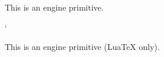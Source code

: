 \begin{function}[]
  {
    \lower
  }
  \begin{syntax}
  \end{syntax}
  This is an engine primitive.
\end{function}






\begin{function}[]
  {
    \lq
  }
  \begin{syntax}
  \end{syntax}

\end{function}



\begin{function}[]
  {
    \lrbox
  }
  \begin{syntax}
  \end{syntax}

\end{function}



\begin{function}[int]
  {
    \ltx@sh@ft
  }
  \begin{syntax}
  \end{syntax}

\end{function}



\begin{function}[]
  {
    \luabytecode
  }
  \begin{syntax}
  \end{syntax}
  This is an engine primitive (Lua\TeX{} only).
\end{function}



\begin{function}[]
  {
    \luachunk
  }
  \begin{syntax}
  \end{syntax}

\end{function}



